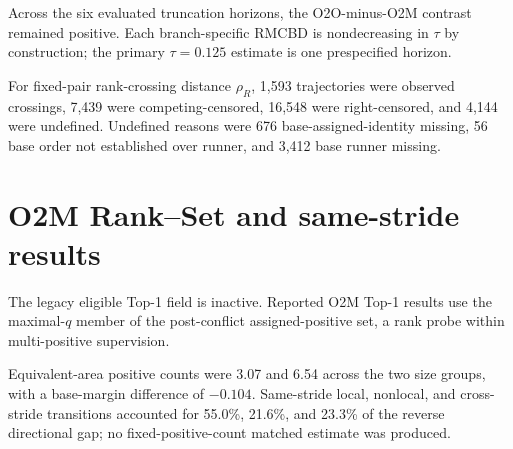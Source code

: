 \documentclass[preprint,10pt]{elsarticle}
\begin{document}
\begin{table}[ht]
\centering
\caption{Sensitivity of the O2O-minus-assigned-positive-O2M RMCBD contrast to the truncation point $\tau$. Brackets are 95\% stratified image-cluster bootstrap intervals from 5,000 replicates.}

\end{table}

Across the six evaluated truncation horizons, the O2O-minus-O2M contrast remained positive. Each branch-specific RMCBD is nondecreasing in $\tau$ by construction; the primary $\tau=0.125$ estimate is one prespecified horizon.

For fixed-pair rank-crossing distance $\rho_R$, 1,593 trajectories were observed crossings, 7,439 were competing-censored, 16,548 were right-censored, and 4,144 were undefined. Undefined reasons were 676 base-assigned-identity missing, 56 base order not established over runner, and 3,412 base runner missing.

\section{O2M Rank--Set and same-stride results}

The legacy eligible Top-1 field is inactive. Reported O2M Top-1 results use the maximal-$q$ member of the post-conflict assigned-positive set, a rank probe within multi-positive supervision.

\begin{table}[ht]
\centering
\caption{O2M Rank--Set contrasts reported as 16--32 minus 8--16 px in percentage points with 95\% stratified image-cluster bootstrap intervals.}
\label{tab:supp_rank_set}
\resizebox{\textwidth}{!}{}
\end{table}

\begin{table}[ht]
\centering
\caption{O2M empty-set structural transitions with 95\% stratified image-cluster bootstrap intervals. Empty/empty has undefined Jaccard and retention; empty/nonempty and nonempty/empty remain explicit state changes.}
\resizebox{\textwidth}{!}{}
\end{table}

Equivalent-area positive counts were 3.07 and 6.54 across the two size groups, with a base-margin difference of $-0.104$. Same-stride local, nonlocal, and cross-stride transitions accounted for 55.0\%, 21.6\%, and 23.3\% of the reverse directional gap; no fixed-positive-count matched estimate was produced.
\end{document}
